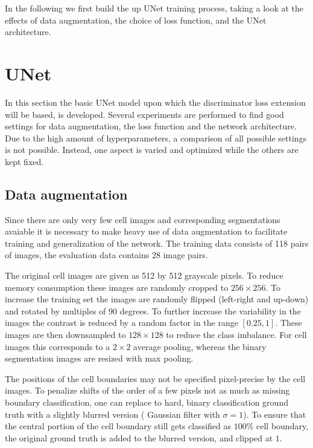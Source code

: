 \documentclass[aps,prl,twocolumn,groupedaddress,amsmath,amssymb]{revtex4-1}
\begin{document}
    In the following we first build the up UNet training process, taking a look at the effects
    of data augmentation, the choice of loss function, and the UNet architecture.

    \section{UNet}
    In this section the basic UNet model upon which the discriminator loss extension will be based,
    is developed. Several experiments are performed to find good settings for data augmentation, the
    loss function and the network architecture. Due to the high amount of hyperparameters, a 
    comparison of all possible settings is not possible. Instead, one aspect is varied and optimized
    while the others are kept fixed.

    \subsection{Data augmentation}
    Since there are only very few cell images and corresponding segmentations avaiable it is 
    necessary to make heavy use of data augmentation to facilitate training and generalization 
    of the network. The training data consists of 118 pairs of images, the evaluation data contains
    28 image pairs.

    The original cell images are given as 512 by 512 grayscale pixels. To reduce memory consumption
    these images are randomly cropped to $256\times256$. To increase the training set the images are
    randomly flipped (left-right and up-down) and rotated by multiples of 90 degrees. To further
    increase the variability in the  images the contrast is reduced by a random factor in the range
    $[0.25, 1]$. These images are then downsampled to $128\times128$ to reduce the class imbalance.
    For cell images this corresponds to a $2\times2$ average pooling, whereas  the binary
    segmentation images are resized with max pooling.

    The positions of the cell boundaries may not be specified pixel-precise by the cell images. To 
    penalize shifts of the order of a few pixels not as much as missing boundary classification, one 
    can replace to hard, binary classification ground truth with a slightly blurred version (
    Gaussian filter with $\sigma=1$). To ensure that the central portion of the cell boundary still
    gets classified as $100\%$ cell boundary, the original ground truth is added to the blurred 
    version, and clipped at $1$.
\end{document}
